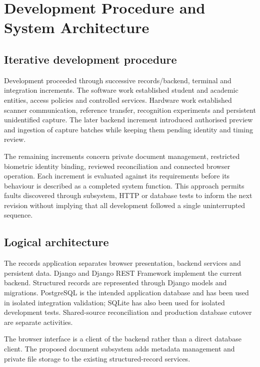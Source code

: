 \section{Development Procedure and System Architecture}\label{sec:3-3}

\subsection{Iterative development procedure}\label{sec:3-3-1}

Development proceeded through successive records/backend, terminal and integration increments. The software work established student and academic entities, access policies and controlled services. Hardware work established scanner communication, reference transfer, recognition experiments and persistent unidentified capture. The later backend increment introduced authorised preview and ingestion of capture batches while keeping them pending identity and timing review.

The remaining increments concern private document management, restricted biometric identity binding, reviewed reconciliation and connected browser operation. Each increment is evaluated against its requirements before its behaviour is described as a completed system function. This approach permits faults discovered through subsystem, HTTP or database tests to inform the next revision without implying that all development followed a single uninterrupted sequence.

\subsection{Logical architecture}\label{sec:3-3-2}

The records application separates browser presentation, backend services and persistent data. Django and Django REST Framework implement the current backend. Structured records are represented through Django models and migrations. PostgreSQL is the intended application database and has been used in isolated integration validation; SQLite has also been used for isolated development tests. Shared-source reconciliation and production database cutover are separate activities.

The browser interface is a client of the backend rather than a direct database client. 
The proposed document subsystem adds metadata management and private file storage to the existing structured-record services.

